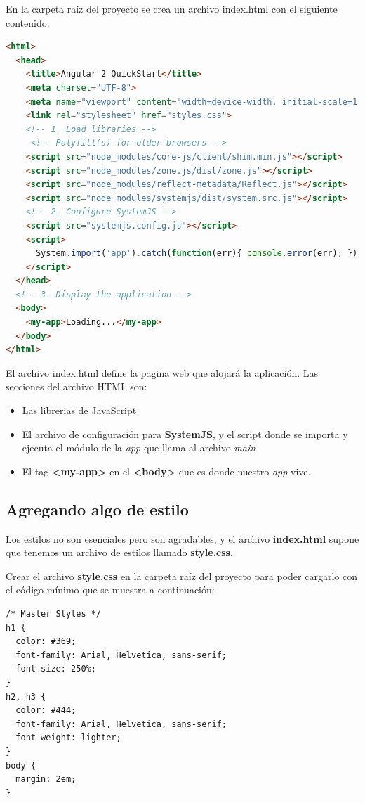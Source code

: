 \documentclass[12pt,twoside]{book}
\begin{document}
En la carpeta raíz del proyecto se crea un archivo index.html con el siguiente contenido:


\begin{lstlisting}[language=html]
<html>
  <head>
    <title>Angular 2 QuickStart</title>
    <meta charset="UTF-8">
    <meta name="viewport" content="width=device-width, initial-scale=1">
    <link rel="stylesheet" href="styles.css">
    <!-- 1. Load libraries -->
     <!-- Polyfill(s) for older browsers -->
    <script src="node_modules/core-js/client/shim.min.js"></script>
    <script src="node_modules/zone.js/dist/zone.js"></script>
    <script src="node_modules/reflect-metadata/Reflect.js"></script>
    <script src="node_modules/systemjs/dist/system.src.js"></script>
    <!-- 2. Configure SystemJS -->
    <script src="systemjs.config.js"></script>
    <script>
      System.import('app').catch(function(err){ console.error(err); });
    </script>
  </head>
  <!-- 3. Display the application -->
  <body>
    <my-app>Loading...</my-app>
  </body>
</html>
\end{lstlisting}

El archivo index.html define la pagina web que alojará la aplicación. Las secciones del archivo HTML son:

\begin{itemize}
\item Las librerias de JavaScript
\item El archivo de configuración para \textbf{SystemJS}, y el script donde se importa y ejecuta el módulo de la \textit{app} que llama al archivo \textit{main} 
\item El tag \textbf{<my-app>} en el \textbf{<body>} que es donde nuestro \textit{app} vive.
\end{itemize}

\subsection{Agregando algo de estilo}
Los estilos no son esenciales pero son agradables, y el archivo \textbf{index.html} supone que tenemos un archivo de estilos llamado \textbf{style.css}.

Crear el archivo \textbf{style.css} en la carpeta raíz del proyecto para poder cargarlo con el código mínimo que se muestra a continuación:


\begin{lstlisting}[language=html]
/* Master Styles */
h1 {
  color: #369;
  font-family: Arial, Helvetica, sans-serif;
  font-size: 250%;
}
h2, h3 {
  color: #444;
  font-family: Arial, Helvetica, sans-serif;
  font-weight: lighter;
}
body {
  margin: 2em;
}
\end{lstlisting}
\end{document}
